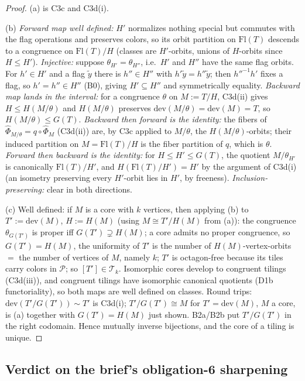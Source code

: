 \documentclass[11pt]{article}
\theoremstyle{definition}
\newcommand{\Flags}{\mathrm{Fl}}
\newcommand{\dev}{\mathrm{dev}}
\newcommand{\T}{\mathcal{T}}
\begin{document}
\begin{proof}
(a) is C3c and C3d(i).

(b) \emph{Forward map well defined:} $H'$ normalizes nothing special but commutes with
the flag operations and preserves colors, so its orbit partition on $\Flags(T)$ descends
to a congruence on $\Flags(T)/H$ (classes are $H'$-orbits, unions of $H$-orbits since
$H \le H'$). \emph{Injective:} suppose $\theta_{H'} = \theta_{H''}$, i.e.\ $H'$ and
$H''$ have the same flag orbits. For $h' \in H'$ and a flag $\tilde y$ there is
$h'' \in H''$ with $h'\tilde y = h''\tilde y$; then $h''^{-1}h'$ fixes a flag, so
$h' = h'' \in H''$ (B0), giving $H' \subseteq H''$ and symmetrically equality.
\emph{Backward map lands in the interval:} for a congruence $\theta$ on $M := T/H$,
C3d(ii) gives $H \le H(M/\theta)$ and $H(M/\theta)$ preserves
$\dev(M/\theta) = \dev(M) = T$, so $H(M/\theta) \le G(T)$.
\emph{Backward then forward is the identity:} the fibers of
$\hat\Phi_{M/\theta} = q \circ \hat\Phi_M$ (C3d(ii)) are, by C3c applied to $M/\theta$,
the $H(M/\theta)$-orbits; their induced partition on $M = \Flags(T)/H$ is the fiber
partition of $q$, which is $\theta$.
\emph{Forward then backward is the identity:} for $H \le H' \le G(T)$, the quotient
$M/\theta_{H'}$ is canonically $\Flags(T)/H'$, and
$H(\Flags(T)/H') = H'$ by the argument of C3d(i) (an isometry preserving every
$H'$-orbit lies in $H'$, by freeness). \emph{Inclusion-preserving:} clear in both
directions.

(c) Well defined: if $M$ is a core with $k$ vertices, then applying (b) to
$T' := \dev(M)$, $H := H(M)$ (using $M \cong T'/H(M)$ from (a)): the congruence
$\theta_{G(T')}$ is proper iff $G(T') \supsetneq H(M)$; a core admits no proper
congruence, so $G(T') = H(M)$, the uniformity of $T'$ is the number of
$H(M)$-vertex-orbits $=$ the number of vertices of $M$, namely $k$; $T'$ is octagon-free
because its tiles carry colors in $\mathcal{P}$; so $[T'] \in \T_k$. Isomorphic cores
develop to congruent tilings (C3d(iii)), and congruent tilings have isomorphic canonical
quotients (D1b functoriality), so both maps are well defined on classes. Round trips:
$\dev(T'/G(T')) \sim T'$ is C3d(i); $T'/G(T') \cong M$ for $T' = \dev(M)$, $M$ a core,
is (a) together with $G(T') = H(M)$ just shown. B2a/B2b put $T'/G(T')$ in the right
codomain. Hence mutually inverse bijections, and the core of a tiling is unique.
\end{proof}

\subsection{Verdict on the brief's obligation-6 sharpening}\label{sec:verdict}
\end{document}
